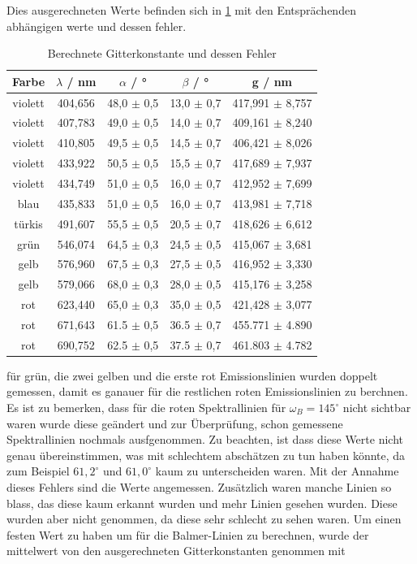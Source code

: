 Dies ausgerechneten Werte befinden sich in \cref{tab:gitterkonstante} mit den Entsprächenden abhängigen werte und dessen fehler.
\begin{table}[htbp]
    \centering
    \begin{tabular}{|c|c|c|c|c|}
        Farbe & $\lambda$ / nm & $\alpha$ / ° & $\beta$ / ° & g / nm \\
        \hline 
        violett & 404,656 & 48,0 $\pm$ 0,5 & 13,0 $\pm$ 0,7 & 417,991 $\pm$ 8,757 \\
        violett & 407,783 & 49,0 $\pm$ 0,5 & 14,0 $\pm$ 0,7 & 409,161 $\pm$ 8,240 \\
        violett & 410,805 & 49,5 $\pm$ 0,5 & 14,5 $\pm$ 0,7 & 406,421 $\pm$ 8,026 \\
        violett & 433,922 & 50,5 $\pm$ 0,5 & 15,5 $\pm$ 0,7 & 417,689 $\pm$ 7,937 \\
        violett & 434,749 & 51,0 $\pm$ 0,5 & 16,0 $\pm$ 0,7 & 412,952 $\pm$ 7,699 \\
        blau & 435,833 & 51,0 $\pm$ 0,5 & 16,0 $\pm$ 0,7 & 413,981 $\pm$ 7,718 \\
        türkis & 491,607 & 55,5 $\pm$ 0,5 & 20,5 $\pm$ 0,7 & 418,626 $\pm$ 6,612 \\
        grün & 546,074 & 64,5 $\pm$ 0,3 & 24,5 $\pm$ 0,5 & 415,067 $\pm$ 3,681 \\
        gelb & 576,960 & 67,5 $\pm$ 0,3 & 27,5 $\pm$ 0,5 & 416,952 $\pm$ 3,330 \\
        gelb & 579,066 & 68,0 $\pm$ 0,3 & 28,0 $\pm$ 0,5 & 415,176 $\pm$ 3,258 \\
        rot & 623,440 & 65,0 $\pm$ 0,3 & 35,0 $\pm$ 0,5 & 421,428 $\pm$ 3,077 \\
        rot & 671,643 & 61.5 $\pm$ 0,5 & 36.5 $\pm$ 0,7 & 455.771 $\pm$ 4.890 \\
        rot & 690,752 & 62.5 $\pm$ 0,5 & 37.5 $\pm$ 0,7 & 461.803 $\pm$ 4.782 
    \end{tabular}
    \caption{Berechnete Gitterkonstante und dessen Fehler}
    \label{tab:gitterkonstante}
\end{table}
für grün, die zwei gelben und die erste rot Emissionslinien wurden doppelt gemessen, damit es ganauer für die restlichen roten Emissionslinien zu berchnen.
Es ist zu bemerken, dass für die roten Spektrallinien für $\omega_B = 145^\circ$ nicht sichtbar waren wurde diese geändert und zur Überprüfung, schon gemessene Spektrallinien nochmals ausfgenommen. 
Zu beachten, ist dass diese Werte nicht genau übereinstimmen, was mit schlechtem abschätzen zu tun haben könnte, da zum Beispiel $61,2^\circ$ und $61,0^\circ$ kaum zu unterscheiden waren.
Mit der Annahme dieses Fehlers sind die Werte angemessen.
Zusätzlich waren manche Linien so blass, das diese kaum erkannt wurden und mehr Linien gesehen wurden. 
Diese wurden aber nicht genommen, da diese sehr schlecht zu sehen waren. 
Um einen festen Wert zu haben um für die Balmer-Linien zu berechnen, wurde der mittelwert von den ausgerechneten Gitterkonstanten genommen mit 

